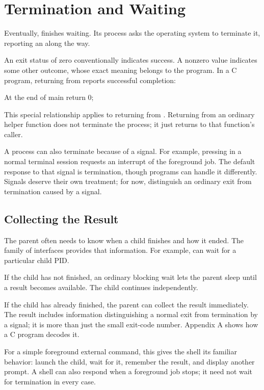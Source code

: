 \documentclass[11pt]{article}
\begin{document}
\section{Termination and Waiting}

Eventually,  finishes waiting.
Its process asks the operating system to terminate it, reporting an  along the way.

An exit status of zero conventionally indicates success.
A nonzero value indicates some other outcome, whose exact meaning belongs to the program.
In a C program, returning  from  reports successful completion:

\begin{codeblock}[unbreakable,listingopts={language=C}]{At the end of main}
return 0;
\end{codeblock}

This special relationship applies to returning from .
Returning from an ordinary helper function does not terminate the process; it just returns to that function's caller.

A process can also terminate because of a signal.
For example, pressing  in a normal terminal session requests an interrupt of the foreground job.
The default response to that signal is termination, though programs can handle it differently.
Signals deserve their own treatment; for now, distinguish an ordinary exit from termination caused by a signal.

\subsection{Collecting the Result}

The parent often needs to know when a child finishes and how it ended.
The  family of interfaces provides that information.
For example,  can wait for a particular child PID.

If the child has not finished, an ordinary blocking wait lets the parent sleep until a result becomes available.
The child continues independently.

If the child has already finished, the parent can collect the result immediately.
The result includes information distinguishing a normal exit from termination by a signal; it is more than just the small exit-code number.
Appendix A shows how a C program decodes it.

For a simple foreground external command, this gives the shell its familiar behavior: launch the child, wait for it, remember the result, and display another prompt.
A shell can also respond when a foreground job stops; it need not wait for termination in every case.
\end{document}
